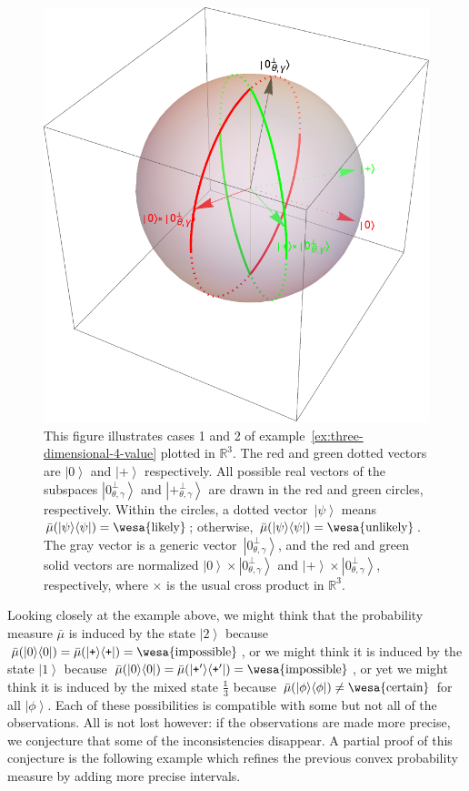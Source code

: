 \documentclass{article}
\theoremstyle{remark}
\newcommand{\imposs}{{\mbox{\wesa{impossible}}}}
\newcommand{\likely}{{\mbox{\wesa{likely}}}}
\newcommand{\unlikely}{{\mbox{\wesa{unlikely}}}}
\newcommand{\necess}{{\mbox{\wesa{certain}}}}
\newcommand{\ket}[1]{{\left\vert{#1}\right\rangle}}
\newcommand{\op}[2]{\ensuremath{\left\vert{#1}\middle\rangle\middle\langle{#2}\right\vert}}
\newcommand{\proj}[1]{\op{#1}{#1}}
\newcommand{\ps}{\texttt{+}}
\begin{document}
\begin{figure}
\begin{center}
\includegraphics[scale=0.38]{proposal/measure4.pdf}
\end{center}
\caption{\label{fig:three-dimensional-4-value}This figure illustrates
  cases 1 and 2 of example~\ref{ex:three-dimensional-4-value} plotted
  in $\mathbb{R}^{3}$. The red and green dotted vectors are $\ket{0}$
  and $\ket{\ps}$ respectively.  All possible real vectors of the subspaces
  $\ket{0_{\theta,\gamma}^{\perp}}$ and
  $\ket{\ps_{\theta,\gamma}^{\perp}}$ are drawn in the red and green
  circles, respectively. Within the circles, a dotted
  vector~$\ket{\psi}$ means $\bar{\mu}(\proj{\psi})=\likely$;
  otherwise, $\bar{\mu}(\proj{\psi})=\unlikely$. The gray vector is a
  generic vector~$\ket{0_{\theta,\gamma}^{\perp}}$, and the red and
  green solid vectors are normalized
  $\ket{0}\times\ket{0_{\theta,\gamma}^{\perp}}$ and
  $\ket{\ps}\times\ket{0_{\theta,\gamma}^{\perp}}$, respectively, where
  $\times$ is the usual cross product in $\mathbb{R}^{3}$.}
\end{figure}

Looking closely at the example above, we might think that the probability
measure $\bar{\mu}$ is induced by the state $\ket{2}$ because $\bar{\mu}(\proj{0})=\bar{\mu}(\proj{\ps})=\imposs$,
or we might think it is induced by the state $\ket{1}$ because $\bar{\mu}(\proj{0})=\bar{\mu}(\proj{\ps'})=\imposs$,
or yet we might think it is induced by the mixed state $\frac{\mathbb{1}}{3}$
because $\bar{\mu}(\proj{\phi})\ne\necess$ for all $\ket{\phi}$.
Each of these possibilities is compatible with some but not all of
the observations. All is not lost however: if the observations are
made more precise, we conjecture that some of the inconsistencies
disappear. A partial proof of this conjecture is the following example
which refines the previous convex probability measure by adding more
precise intervals.
\end{document}
